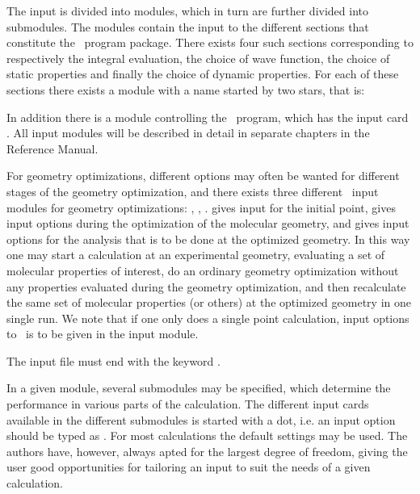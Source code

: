 The input is divided into modules, which in turn are
further divided into submodules. The modules contain
the input to the different 
sections that constitute the \siraba\ program package. There exists
four such sections corresponding to respectively the integral
evaluation, the choice of wave function, the
choice of static properties and finally
the choice of dynamic properties. For each of 
these sections there exists a module with a name started by two stars,
that is: 

\begin{list}{}{}
\item {}
\item {}
\item {}
\item {}
\end{list}

In addition there is a module controlling the \siraba\ program, which
has the input card . All
input modules will be described in detail in separate chapters in the
Reference Manual. 

For geometry optimizations,
different options may often be wanted for different stages of the
geometry optimization, and there exists three different \aba\ input
modules for geometry optimizations: , ,
.  gives input for the initial point,
 gives input options during the optimization of the
molecular geometry, and  gives input options for the
analysis that is to be done at the optimized geometry. In this way one
may start a calculation at an experimental geometry, evaluating a set
of molecular properties of interest, do an ordinary geometry
optimization without any properties evaluated during the geometry
optimization, and then recalculate the same set of molecular
properties (or others) at the optimized geometry in one single run. We
note that if one only does a single point calculation, input
options to \aba\ is to be given in the  input
module.

The input file must end with the keyword .

In a given module, several submodules may be specified, which
determine the performance in various parts of the calculation. The
different input cards available in the different submodules is started
with a dot, i.e. an input option should be typed as . For
most calculations the default settings may be used. The authors have,
however, always apted for the largest degree of freedom, giving the
user good opportunities for tailoring an input to suit
the needs of a given calculation.


